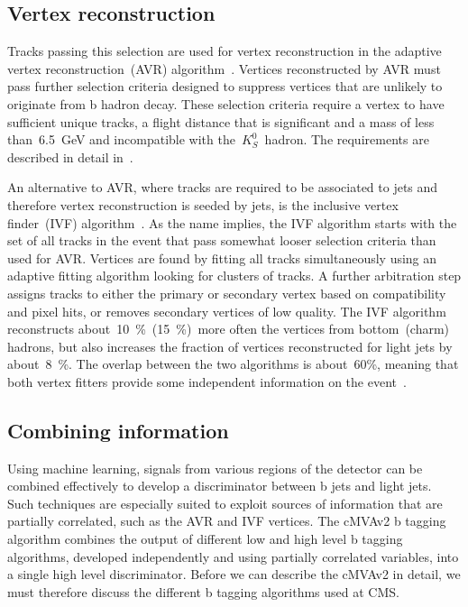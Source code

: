\subsection{Vertex reconstruction}
Tracks passing this selection are used for vertex reconstruction in the adaptive vertex reconstruction~(AVR) algorithm~\cite{Waltenberger:2008zz}. Vertices reconstructed by AVR must pass further selection criteria designed to suppress vertices that are unlikely to originate from b hadron decay. These selection criteria require a vertex to have sufficient unique tracks, a flight distance that is significant and a mass of less than~6.5~GeV and incompatible with the~$K_S^0$~hadron. The requirements are described in detail in~\cite{CMS-PAS-BTV-15-001}.

An alternative to AVR, where tracks are required to be associated to jets and therefore vertex reconstruction is seeded by jets, is the inclusive vertex finder~(IVF) algorithm~\cite{Khachatryan:2011wq}. As the name implies, the IVF algorithm starts with the set of all tracks in the event that pass somewhat looser selection criteria than used for AVR. Vertices are found by fitting all tracks simultaneously using an adaptive fitting algorithm looking for clusters of tracks. A further arbitration step assigns tracks to either the primary or secondary vertex based on compatibility and pixel hits, or removes secondary vertices of low quality. The IVF algorithm reconstructs about~10~\%~(15~\%)~more often the vertices from bottom~(charm) hadrons, but also increases the fraction of vertices reconstructed for light jets by about~8~\%. The overlap between the two algorithms is about~60\%, meaning that both vertex fitters provide some independent information on the event~\cite{CMS-PAS-BTV-15-001}.

\subsection{Combining information}
Using machine learning, signals from various regions of the detector can be combined effectively to develop a discriminator between b jets and light jets. Such techniques are especially suited to exploit sources of information that are partially correlated, such as the AVR and IVF vertices. The cMVAv2 b tagging algorithm combines the output of different low and high level b tagging algorithms, developed independently and using partially correlated variables, into a single high level discriminator. Before we can describe the cMVAv2 in detail, we must therefore discuss the different b tagging algorithms used at CMS.

